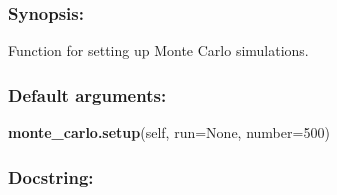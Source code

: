 \subsubsection{Synopsis:}

Function for setting up Monte Carlo simulations.

\subsubsection{Default arguments:}

\textsf{\textbf{monte\_carlo.setup}(self, run=None, number=500)
}


\subsubsection{Docstring:}

